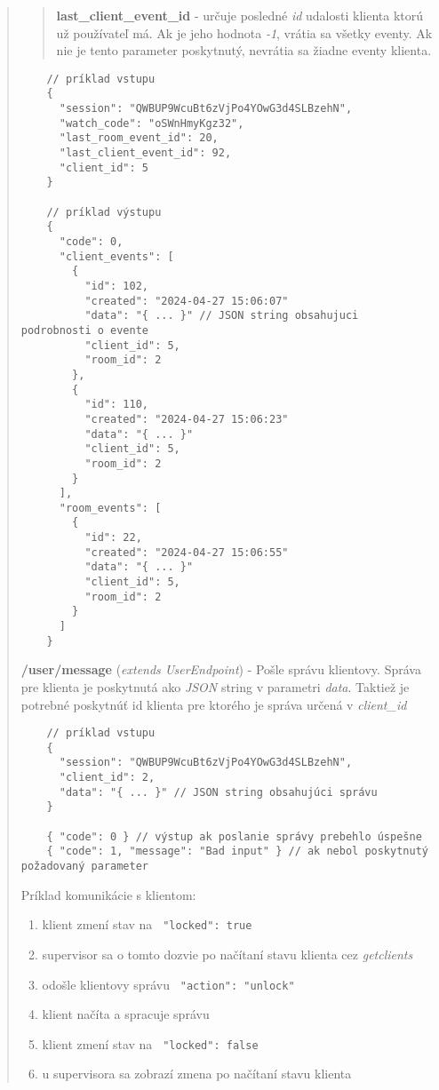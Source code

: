 \documentclass{article}
\newcommand{\filedesc}[1]{\vspace{0.3cm} \noindent \textbf{#1}}
\begin{document}
\begin{quote}
\begin{quote}
  \filedesc{last{\_}client{\_}event{\_}id} - určuje posledné \emph{id} udalosti klienta ktorú už používateľ má. Ak je jeho hodnota \emph{-1}, vrátia sa všetky eventy. Ak nie je tento parameter poskytnutý, nevrátia sa žiadne eventy klienta.
  \end{quote} 

  \begin{verbatim}
    // príklad vstupu
    {
      "session": "QWBUP9WcuBt6zVjPo4YOwG3d4SLBzehN",
      "watch_code": "oSWnHmyKgz32",
      "last_room_event_id": 20,
      "last_client_event_id": 92,
      "client_id": 5
    }

    // príklad výstupu
    {
      "code": 0,
      "client_events": [
        {
          "id": 102,
          "created": "2024-04-27 15:06:07"
          "data": "{ ... }" // JSON string obsahujuci podrobnosti o evente
          "client_id": 5,
          "room_id": 2
        },
        {
          "id": 110,
          "created": "2024-04-27 15:06:23"
          "data": "{ ... }"
          "client_id": 5,
          "room_id": 2
        }
      ],
      "room_events": [
        {
          "id": 22,
          "created": "2024-04-27 15:06:55"
          "data": "{ ... }"
          "client_id": 5,
          "room_id": 2
        }
      ]
    }
  \end{verbatim}
  
  \filedesc{/user/message} (\emph{extends UserEndpoint}) - Pošle správu klientovy. Správa pre klienta je poskytnutá ako \emph{JSON} string v parametri \emph{data}. Taktiež je potrebné poskytnúť id klienta pre ktorého je správa určená v \emph{client{\_}id}
  
  \begin{verbatim}
    // príklad vstupu
    {
      "session": "QWBUP9WcuBt6zVjPo4YOwG3d4SLBzehN",
      "client_id": 2,
      "data": "{ ... }" // JSON string obsahujúci správu
    }

    { "code": 0 } // výstup ak poslanie správy prebehlo úspešne
    { "code": 1, "message": "Bad input" } // ak nebol poskytnutý požadovaný parameter
  \end{verbatim}
  
  Príklad komunikácie s klientom:
  \begin{enumerate}
    \item klient zmení stav na \texttt{{ "locked": true }}
    \item supervisor sa o tomto dozvie po načítaní stavu klienta cez \emph{getclients}
    \item odošle klientovy správu \texttt{{ "action": "unlock" }}
    \item klient načíta a spracuje správu
    \item klient zmení stav na \texttt{{ "locked": false }}
    \item u supervisora sa zobrazí zmena po načítaní stavu klienta
  \end{enumerate}

\end{quote}
\end{document}
